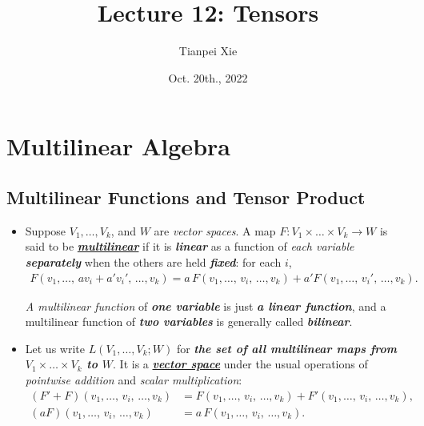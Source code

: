 \documentclass[11pt]{article}
\begin{document}
\title{Lecture 12: Tensors}
\author{ Tianpei Xie}
\date{Oct. 20th., 2022}
\maketitle
\tableofcontents
\newpage
\section{Multilinear Algebra}
\subsection{Multilinear Functions and Tensor Product}
\begin{itemize}
\item 
\begin{definition}
Suppose $V_1,\ldots,V_k$, and $W$ are \emph{vector spaces}. A map $F: V_1\times \ldots \times V_k \rightarrow W$ is said to be \underline{\emph{\textbf{multilinear}}} if it is \emph{\textbf{linear}} as a function of \emph{each variable \textbf{separately}} when the others are held \emph{\textbf{fixed}}: for each $i$,
\begin{align*}
F(v_1,\ldots,\,av_i + a'v_i',\, \ldots, v_k) = a\,F(v_1,\ldots,\,v_i,\, \ldots, v_k)  + a'F(v_1,\ldots,\, v_i',\, \ldots, v_k).
\end{align*} 

\emph{A multilinear function} of \emph{\textbf{one variable}} is just \emph{\textbf{a linear function}}, and a multilinear
function of \emph{\textbf{two variables}} is generally called \emph{\textbf{bilinear}}.
\end{definition}

\item \begin{remark}
Let us write $L(V_1,\ldots,V_k ; W)$ for \emph{\textbf{the set of all multilinear maps from $V_1\times \ldots \times V_k$ to $W$}}. It is a \underline{\emph{\textbf{vector space}}} under the usual operations of \emph{pointwise addition} and \emph{scalar multiplication}:
\begin{align*}
(F'+F)(v_1,\ldots,\,v_i,\, \ldots, v_k) &= F(v_1,\ldots,\,v_i,\, \ldots, v_k)  +  F'(v_1,\ldots,\,v_i,\, \ldots, v_k),\\
(aF)(v_1,\ldots,\,v_i,\, \ldots, v_k)  &= a\,F(v_1,\ldots,\,v_i,\, \ldots, v_k).
\end{align*}
\end{remark}


\end{itemize}
\end{document}
